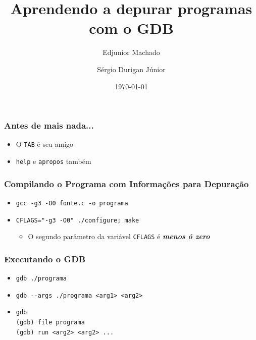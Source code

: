 \documentclass[xcolor=pdftex,dvipsnames,table,t]{beamer}
\title{Aprendendo a depurar programas com o GDB}
\author{Edjunior Machado \and
	Sérgio Durigan Júnior}
\date[Unicamp]{\today}
\begin{document}

\begin{frame}[fragile]
	\frametitle{Antes de mais nada...}
	\begin{itemize}
	  \item{O \verb|TAB| é seu amigo}
	  \item{\verb|help| e \verb|apropos| também}
	\end{itemize}
\end{frame}

\begin{frame}[fragile]
	\frametitle{Compilando o Programa com Informações para Depuração}
	  \begin{itemize}
	    \item{\verb|gcc -g3 -O0 fonte.c -o programa|}
	    \item{\verb|CFLAGS="-g3 -O0" ./configure; make|}
	      \begin{itemize}
		\item{O segundo parâmetro da variável \verb|CFLAGS| é \textbf{\textit{menos ó zero}}}
	      \end{itemize}
	  \end{itemize}
\end{frame}

\begin{frame}[fragile]
	\frametitle{Executando o GDB}
	  \begin{itemize}
	    \item{\verb|gdb ./programa|}
	    \item{\verb|gdb --args ./programa <arg1> <arg2>|}
	    \item{\verb|gdb| \\
		\verb|(gdb) file programa| \\
		\verb|(gdb) run <arg2> <arg2> ...|}
	  \end{itemize}
\end{frame}
\end{document}
